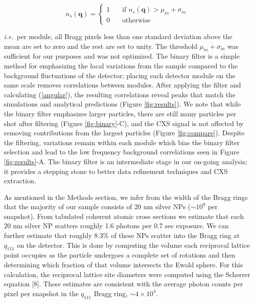 \documentclass [11pt,fleqn]{article}
\begin{document}
\[  n_{s}(\bm q ) = 
 \begin{cases} 
   1 & \quad \text{if } n_{s}(\bm q ) > \mu_m +  \sigma_m\\
   0 & \quad \text{otherwise} 
 \end{cases} 
 \]

\textit{i.e.}~per module, all Bragg pixels less than one standard deviation above the mean are set to zero and the rest are set to unity. The threshold $\mu_m + \sigma_m$ was sufficient for our purposes and was not optimized. The binary filter is a simple method for emphasizing the local variations from the sample compared to the background fluctuations of the detector; placing each detector module on the same scale removes correlations between modules. After applying the filter and calculating (\ref{angular}), the resulting correlations reveal peaks that match the simulations and analytical predictions (Figure \ref{fig:results}). We note that while the binary filter emphasizes larger particles, there are still many particles per shot after filtering (Figure \ref{fig:binary}-C), and the CXS signal is not affected by removing contributions from the largest particles (Figure \ref{fig:compare}). Despite the filtering, variations remain within each module which bias the binary filter selection and lead to the low frequency background correlations seen in Figure \ref{fig:results}-A. The binary filter is an intermediate stage in our on-going analysis; it provides a stepping stone to better data refinement techniques and CXS extraction.

As mentioned in the Methods section, we infer from the width of the Bragg rings that the majority of our sample consists of 20 nm silver NPs ($\sim10^9$ per snapshot). From tabulated coherent atomic cross sections \cite{Henke:1993wx} we estimate that each 20 nm silver NP scatters roughly 1.6 photons per 0.7 sec exposure. We can further estimate that roughly 8.3\% of these NPs scatter into the Bragg ring at $q_{111}$ on the detector. This is done by computing the volume each reciprocal lattice point occupies as the particle undergoes a complete set of rotations and then determining which fraction of that volume intersects the Ewald sphere. For this calculation, the reciprocal lattice site diameters were computed using the Scherrer equation [8]. These estimates are consistent with the average photon counts per pixel per snapshot in the $q_{111}$ Bragg ring, $\sim 4 \times 10^4$. 
\end{document}
